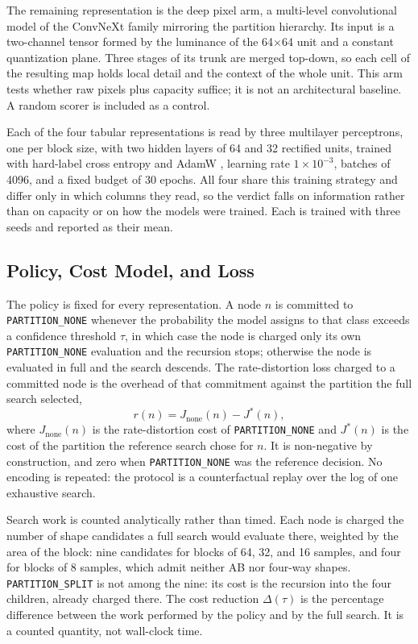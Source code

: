 \documentclass[conference]{IEEEtran}
\begin{document}
The remaining representation is the deep pixel arm, a multi-level convolutional
model of the ConvNeXt family \cite{convnext} mirroring the partition hierarchy.
Its input is a two-channel tensor formed by the luminance of the 64$\times$64
unit and a constant quantization plane. Three stages of its trunk are merged
top-down, so each cell of the resulting map holds local detail and the context
of the whole unit. This arm tests whether raw pixels plus capacity suffice; it
is not an architectural baseline. A random scorer is included as a control.

Each of the four tabular representations is read by three multilayer
perceptrons, one per block size, with two hidden layers of 64 and 32 rectified
units, trained with hard-label cross entropy and AdamW \cite{adamw}, learning
rate $1 \times 10^{-3}$, batches of 4096, and a fixed budget of 30 epochs. All
four share this training strategy and differ only in which columns they read, so
the verdict falls on information rather than on capacity or on how the models
were trained. Each is trained with three seeds and reported as their mean.

\subsection{Policy, Cost Model, and Loss}

The policy is fixed for every representation. A node $n$ is committed to
\texttt{PARTITION\_NONE} whenever the probability the model assigns to that class
exceeds a confidence threshold $\tau$, in which case the node is charged only its
own \texttt{PARTITION\_NONE} evaluation and the recursion stops; otherwise the
node is evaluated in full and the search descends. The rate-distortion loss
charged to a committed node is the overhead of that commitment against the
partition the full search selected,
\begin{equation}
r(n) = J_{\mathrm{none}}(n) - J^{*}(n),
\label{eqn_regret}
\end{equation}
where $J_{\mathrm{none}}(n)$ is the rate-distortion cost of
\texttt{PARTITION\_NONE} and $J^{*}(n)$ is the cost of the partition the reference
search chose for $n$. It is non-negative by construction, and zero when \texttt{PARTITION\_NONE} was the reference decision. No encoding is repeated: the protocol is a counterfactual replay over the log of one exhaustive search.

Search work is counted analytically rather than timed. Each node is charged the
number of shape candidates a full search would evaluate there, weighted by the
area of the block: nine candidates for blocks of 64, 32, and 16 samples, and four for blocks of 8 samples, which admit neither AB nor four-way shapes.
\texttt{PARTITION\_SPLIT} is not among the nine: its cost is the recursion into the four children, already charged there. The cost reduction $\Delta(\tau)$ is the percentage difference between the work performed by the policy and by the full search. It is a counted quantity, not wall-clock time.
\end{document}
